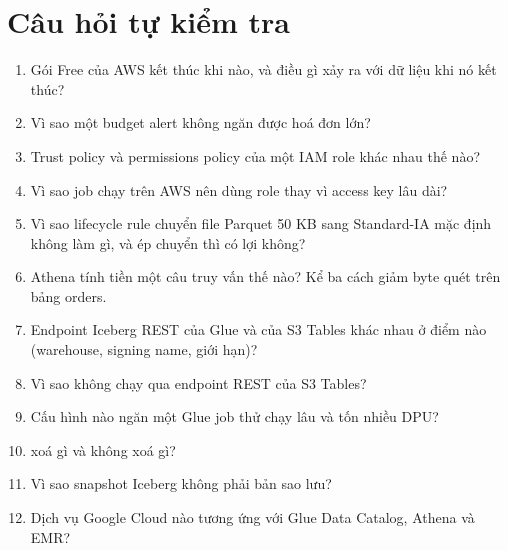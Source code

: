 \section{Câu hỏi tự kiểm tra}
\begin{enumerate}
  \item Gói Free của AWS kết thúc khi nào, và điều gì xảy ra với dữ liệu khi nó kết thúc?
  \item Vì sao một budget alert không ngăn được hoá đơn lớn?
  \item Trust policy và permissions policy của một IAM role khác nhau thế nào?
  \item Vì sao job chạy trên AWS nên dùng role thay vì access key lâu dài?
  \item Vì sao lifecycle rule chuyển file Parquet 50 KB sang Standard-IA mặc định không làm gì, và ép chuyển thì có lợi không?
  \item Athena tính tiền một câu truy vấn thế nào? Kể ba cách giảm byte quét trên bảng orders.
  \item Endpoint Iceberg REST của Glue và của S3 Tables khác nhau ở điểm nào (warehouse, signing name, giới hạn)?
  \item Vì sao  không chạy qua endpoint REST của S3 Tables?
  \item Cấu hình nào ngăn một Glue job thử chạy lâu và tốn nhiều DPU?
  \item {} xoá gì và không xoá gì?
  \item Vì sao snapshot Iceberg không phải bản sao lưu?
  \item Dịch vụ Google Cloud nào tương ứng với Glue Data Catalog, Athena và EMR?
\end{enumerate}

